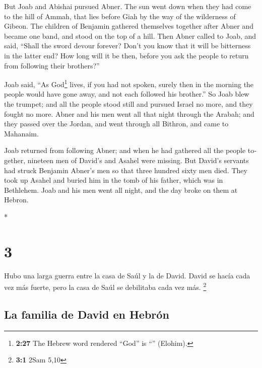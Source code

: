 \begin{paracol}{2}
\begin{otherlanguage}{english}
 But Joab and Abishai pursued Abner. The sun went down
when they had come to the hill of Ammah, that lies before Giah by the
way of the wilderness of Gibeon.  The children of
Benjamin gathered themselves together after Abner and became one band,
and stood on the top of a hill.  Then Abner called to
Joab, and said, ``Shall the sword devour forever? Don't you know that it
will be bitterness in the latter end? How long will it be then, before
you ask the people to return from following their brothers?''

 Joab said, ``As God\footnote{\textbf{2:27} The Hebrew
  word rendered ``God'' is ``'' (Elohim).} lives, if you
had not spoken, surely then in the morning the people would have gone
away, and not each followed his brother.''  So Joab blew
the trumpet; and all the people stood still and pursued Israel no more,
and they fought no more.  Abner and his men went all that
night through the Arabah; and they passed over the Jordan, and went
through all Bithron, and came to Mahanaim.

 Joab returned from following Abner; and when he had
gathered all the people together, nineteen men of David's and Asahel
were missing.  But David's servants had struck Benjamin
Abner's men so that three hundred sixty men died.  They
took up Asahel and buried him in the tomb of his father, which was in
Bethlehem. Joab and his men went all night, and the day broke on them at
Hebron.

\end{otherlanguage}

\switchcolumn[0]*

\hypertarget{section-4}{%
\section{3}\label{section-4}}

 Hubo una larga guerra entre la casa de Saúl y la de
David. David se hacía cada vez más fuerte, pero la casa de Saúl se
debilitaba cada vez más. \footnote{\textbf{3:1} 2Sam 5,10}

\hypertarget{la-familia-de-david-en-hebruxf3n}{%
\subsection{La familia de David en
Hebrón}\label{la-familia-de-david-en-hebruxf3n}}


\end{paracol}
